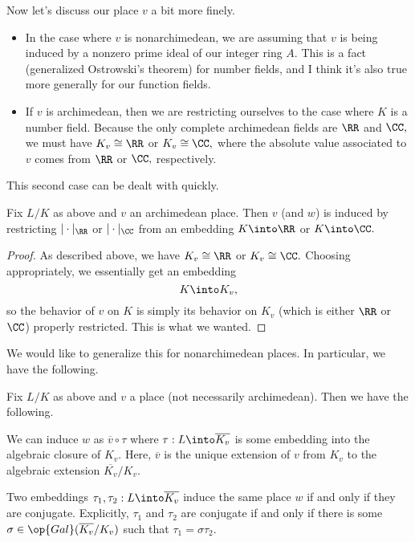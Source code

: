 \documentclass[../notes.tex]{subfiles}
\begin{document}
Now let's discuss our place $v$ a bit more finely.
\begin{itemize}
	\item In the case where $v$ is nonarchimedean, we are assuming that $v$ is being induced by a nonzero prime ideal of our integer ring $A.$ This is a fact (generalized Ostrowski's theorem) for number fields, and I think it's also true more generally for our function fields.
	\item If $v$ is archimedean, then we are restricting ourselves to the case where $K$ is a number field. Because the only complete archimedean fields are $\RR$ and $\CC,$ we must have $K_v\cong\RR$ or $K_v\cong\CC,$ where the absolute value associated to $v$ comes from $\RR$ or $\CC,$ respectively.
\end{itemize}
This second case can be dealt with quickly.
\begin{prop}
	Fix $L/K$ as above and $v$ an archimedean place. Then $v$ (and $w$) is induced by restricting $|\cdot|_\RR$ or $|\cdot|_\CC$ from an embedding $K\into\RR$ or $K\into\CC.$
\end{prop}
\begin{proof}
	As described above, we have $K_v\cong\RR$ or $K_v\cong\CC.$ Choosing appropriately, we essentially get an embedding
	\[K\into K_v,\]
	so the behavior of $v$ on $K$ is simply its behavior on $K_v$ (which is either $\RR$ or $\CC$) properly restricted. This is what we wanted.
\end{proof}
We would like to generalize this for nonarchimedean places. In particular, we have the following.
\begin{theorem}[Extension]
	Fix $L/K$ as above and $v$ a place (not necessarily archimedean). Then we have the following.
	\begin{listalph}
		\item We can induce $w$ as $\overline v\circ\tau$ where $\tau:L\into\overline{K_v}$ is some embedding into the algebraic closure of $K_v.$ Here, $\overline v$ is the unique extension of $v$ from $K_v$ to the algebraic extension $\overline{K_v}/K_v.$
		\item Two embeddings $\tau_1,\tau_2:L\into\overline{K_v}$ induce the same place $w$ if and only if they are conjugate. Explicitly, $\tau_1$ and $\tau_2$ are conjugate if and only if there is some $\sigma\in\op{Gal}(\overline{K_v}/K_v)$ such that $\tau_1=\sigma\tau_2.$
	\end{listalph}
\end{theorem}
\end{document}
